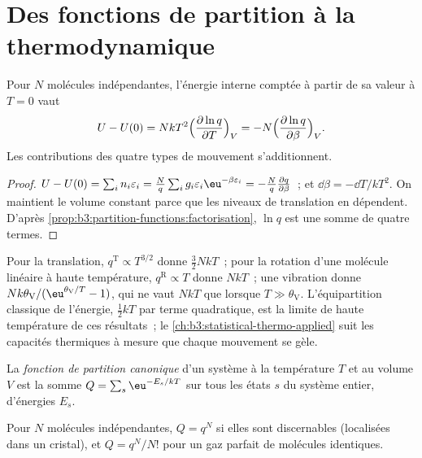 \section{Des fonctions de partition à la thermodynamique}

\begin{theorem}\label{thm:b3:partition-functions:internal-energy}
Pour $N$ molécules indépendantes, l'énergie interne comptée à partir de
sa valeur à
$T = 0$ vaut
\[
  U - U(0) = NkT^2\Bigl(\frac{\partial\ln q}{\partial T}\Bigr)_V
          = -N\Bigl(\frac{\partial\ln q}{\partial\beta}\Bigr)_V .
\]
Les contributions des quatre types de mouvement s'additionnent.
\end{theorem}

\begin{proof}
$U - U(0) = \sum_in_i\varepsilon_i = \frac Nq\sum_ig_i\varepsilon_i\eu^{-\beta\varepsilon_i} = -\frac Nq\frac{\partial q}{\partial\beta}$~;
et $\dd\beta = -\dd T/kT^2$. On maintient le volume constant parce que
les niveaux de translation en dépendent. D'après
\cref{prop:b3:partition-functions:factorisation}, $\ln q$ est une
somme de quatre termes.
\end{proof}

Pour la translation, $q^{\mathrm T} \propto T^{3/2}$ donne $\frac32NkT$~;
pour la rotation d'une molécule linéaire à haute température,
$q^{\mathrm R} \propto T$ donne $NkT$~; une vibration donne
$Nk\theta_{\mathrm V}/(\eu^{\theta_{\mathrm V}/T} - 1)$, qui ne vaut $NkT$ que lorsque $T \gg \theta_{\mathrm V}$. L'équipartition classique de l'énergie,
$\frac12kT$ par terme quadratique, est la limite de haute température de
ces résultats~; le \cref{ch:b3:statistical-thermo-applied}
suit les capacités thermiques à mesure que chaque mouvement se gèle.

\begin{definition}\label{def:b3:partition-functions:canonical}
La \emph{fonction de partition canonique} d'un
système à la température $T$ et au volume $V$ est la somme
$Q = \sum_s\eu^{-E_s/kT}$ sur tous les
états $s$ du système entier, d'énergies $E_s$.
\end{definition}

\begin{proposition}\label{prop:b3:partition-functions:canonical}
Pour $N$ molécules indépendantes, $Q = q^N$ si elles sont discernables
(localisées dans un cristal), et $Q = q^N/N!$ pour un gaz parfait de
molécules identiques.
\end{proposition}

